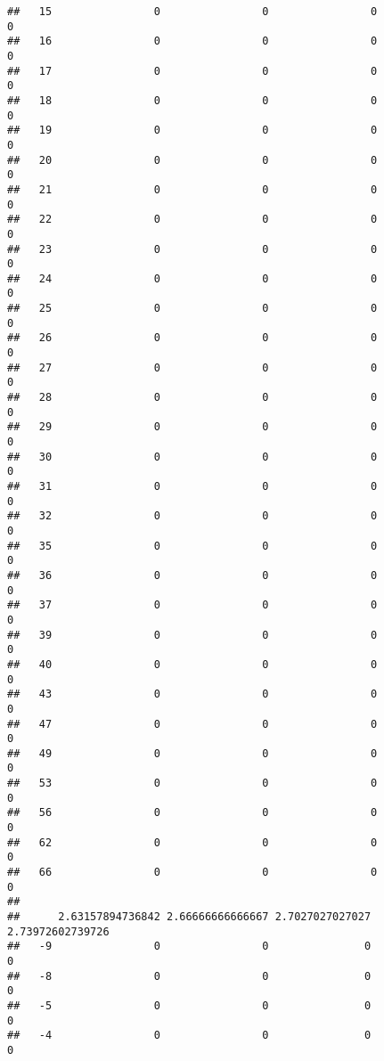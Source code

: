 \documentclass[]{article}
\begin{document}
\begin{verbatim}
##   15                0                0                0                0
##   16                0                0                0                0
##   17                0                0                0                0
##   18                0                0                0                0
##   19                0                0                0                0
##   20                0                0                0                0
##   21                0                0                0                0
##   22                0                0                0                0
##   23                0                0                0                0
##   24                0                0                0                0
##   25                0                0                0                0
##   26                0                0                0                0
##   27                0                0                0                0
##   28                0                0                0                0
##   29                0                0                0                0
##   30                0                0                0                0
##   31                0                0                0                0
##   32                0                0                0                0
##   35                0                0                0                0
##   36                0                0                0                0
##   37                0                0                0                0
##   39                0                0                0                0
##   40                0                0                0                0
##   43                0                0                0                0
##   47                0                0                0                0
##   49                0                0                0                0
##   53                0                0                0                0
##   56                0                0                0                0
##   62                0                0                0                0
##   66                0                0                0                0
##     
##      2.63157894736842 2.66666666666667 2.7027027027027 2.73972602739726
##   -9                0                0               0                0
##   -8                0                0               0                0
##   -5                0                0               0                0
##   -4                0                0               0                0

\end{verbatim}
\end{document}
